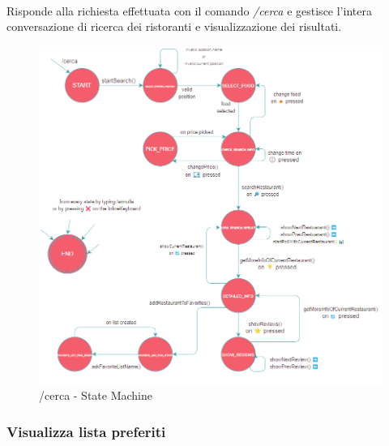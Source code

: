 \documentclass[a4paper, 12pt]{article}
\begin{document}
	\paragraph{}
	Risponde alla richiesta effettuata con il comando \textit{/cerca} e gestisce l'intera conversazione di ricerca dei ristoranti e visualizzazione dei risultati.\\
	\begin{figure}[h!]
		\centering
		\includegraphics[scale=0.6]{TasteIt_Cerca_StateMachine.png}
		\caption{/cerca - State Machine}
		\label{fig:CercaStateMachine}
	\end{figure}
	
	\newpage
	\subsubsection{Visualizza lista preferiti}
\end{document}
